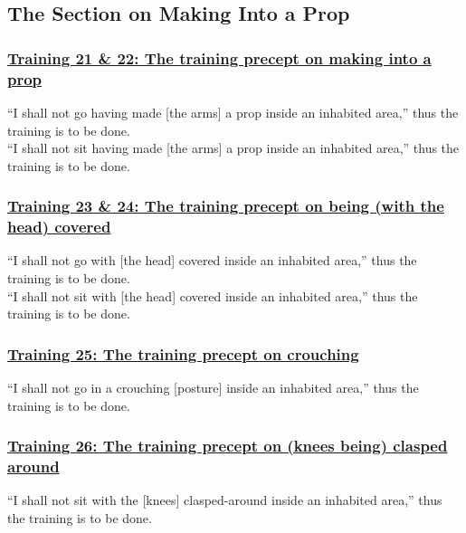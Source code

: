 \setsubsecheadstyle{\subsectionFmt}
\subsection{The Section on Making Into a Prop}
\label{trainings-vagga3}

\subsubsection*{\hyperref[sekh21-22]{Training 21 \& 22: The training precept on making into a prop}}
\label{training21-22}
``I shall not go having made [the arms] a prop inside an inhabited area,'' thus the training is to be done.\\
``I shall not sit having made [the arms] a prop inside an inhabited area,'' thus the training is to be done.



\subsubsection*{\hyperref[sekh23-24]{Training 23 \& 24: The training precept on being (with the head) covered}}
\label{training23-24}
``I shall not go with [the head] covered inside an inhabited area,'' thus the training is to be done.\\
``I shall not sit with [the head] covered inside an inhabited area,'' thus the training is to be done.



\subsubsection*{\hyperref[sekh25]{Training 25: The training precept on crouching}}
\label{training25}
``I shall not go in a crouching [posture] inside an inhabited area,'' thus the training is to be done.



\subsubsection*{\hyperref[sekh26]{Training 26: The training precept on (knees being) clasped around}}
\label{training26}
``I shall not sit with the [knees] clasped-around inside an inhabited area,'' thus the training is to be done.



